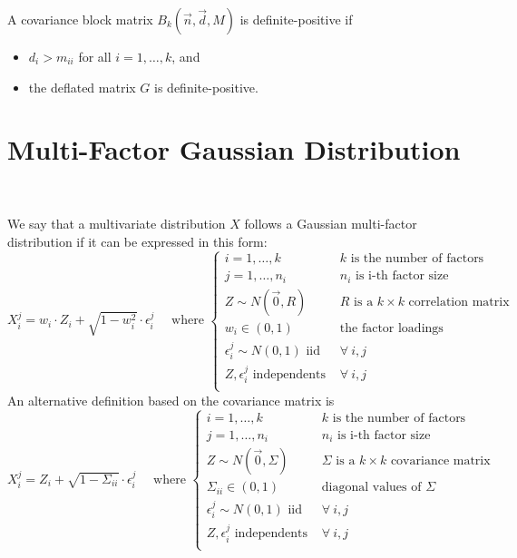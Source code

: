 \documentclass[11pt,fleqn]{book} %
\begin{document}
\begin{corollary}
	A covariance block matrix $B_k(\vec{n},\vec{d},M)$ is definite-positive if
	\begin{itemize}
		\item $d_i > m_{ii}$ for all $i=1,\dots,k$, and
		\item the deflated matrix $G$ is definite-positive.
	\end{itemize}
\end{corollary}

\section{Multi-Factor Gaussian Distribution}
\label{ap:mfgm}
~\\
\begin{definition}
	\label{def:gmfm}
	We say that a multivariate distribution $X$ follows a Gaussian multi-factor
	distribution if it can be expressed in this form:
	\begin{displaymath}
		X_i^j = w_i \cdot Z_i + \sqrt{1-w_i^2} \cdot \epsilon_i^j
		\quad \text{ where } \left\{
		\begin{array}{ll}
			i = 1, \dots, k & \text{$k$ is the number of factors} \\
			j = 1, \dots, n_i & \text{$n_i$ is i-th factor size} \\
			Z \sim N(\vec{0},R) & \text{$R$ is a $k {\times} k$ correlation matrix} \\
			w_i \in (0,1) & \text{the factor loadings } \\
			\epsilon_i^j \sim N(0,1) \text { iid } & \forall\ i,j \\
			Z, \epsilon_i^j \text{ independents } & \forall\ i,j \\
		\end{array}
		\right.
	\end{displaymath}
	An alternative definition based on the covariance matrix is
	\begin{displaymath}
		X_i^j = Z_i + \sqrt{1-\Sigma_{ii}} \cdot \epsilon_i^j
		\quad \text{ where } \left\{
		\begin{array}{ll}
			i = 1, \dots, k & \text{$k$ is the number of factors} \\
			j = 1, \dots, n_i & \text{$n_i$ is i-th factor size} \\
			Z \sim N(\vec{0},\Sigma) & \text{$\Sigma$ is a $k {\times} k$ covariance matrix} \\
			\Sigma_{ii} \in (0,1) & \text{diagonal values of $\Sigma$} \\
			\epsilon_i^j \sim N(0,1) \text { iid } & \forall\ i,j \\
			Z, \epsilon_i^j \text{ independents } & \forall\ i,j \\
		\end{array}
		\right.
	\end{displaymath}
\end{definition}
\end{document}
